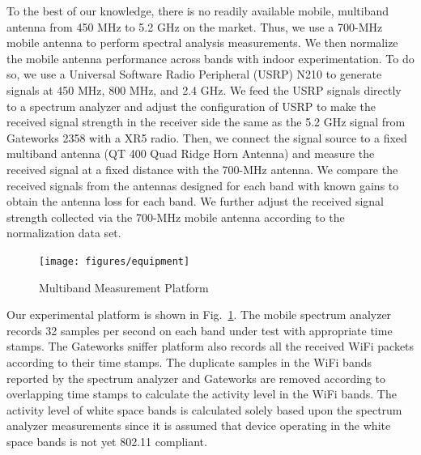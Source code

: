 To the best of our knowledge, there is no readily available mobile, multiband antenna from 450 MHz to 5.2 
GHz on the market. Thus, we use a 700-MHz mobile antenna to perform spectral analysis measurements. We then 
normalize the mobile antenna performance across bands with indoor experimentation. To do so, we use a 
Universal Software Radio Peripheral (USRP) N210 to generate signals at 450 MHz, 800 MHz, and 2.4 GHz. We 
feed the USRP signals directly to a spectrum analyzer and adjust the configuration of USRP to make the 
received signal strength in the receiver side the same as the 5.2 GHz signal from Gateworks 2358 with 
a XR5 radio. 
Then, we connect the signal source to a fixed multiband antenna (QT 400 Quad Ridge Horn Antenna) and 
measure the received signal at a fixed distance with the 700-MHz antenna. We compare the received 
signals from the antennas designed for each band with known gains to obtain the antenna loss for 
each band. We further adjust the received signal strength collected via the 700-MHz mobile antenna 
according to the normalization data set.

  \begin{figure}
  \centering
  \texttt{[image: figures/equipment]}
  \vspace{-0.1in}
  \caption{Multiband Measurement Platform}
  \label{fig:equipment}
  \vspace{-0.3in}
  \end{figure}
  
Our experimental platform is shown in Fig.~\ref{fig:equipment}. The mobile spectrum analyzer records 32 samples 
per second on each band under test with appropriate time stamps. The Gateworks sniffer platform also records all 
the received WiFi packets according to their time stamps. The duplicate samples in the WiFi bands reported by the spectrum analyzer 
and Gateworks are removed according to overlapping time stamps to calculate the activity level in the WiFi 
bands. The activity level of white space bands is calculated solely based upon the spectrum analyzer measurements 
since it is assumed that device operating in the white space bands is not yet 802.11 compliant.

